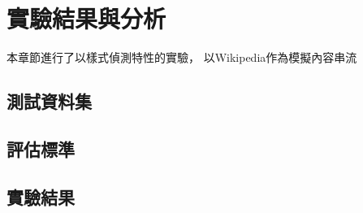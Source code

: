 %
%
%
\chapter{實驗結果與分析}
\label{c:exp}

本章節進行了以樣式偵測特性的實驗，
以Wikipedia作為模擬內容串流


\section{測試資料集}
\label{s:dataset}

\section{評估標準}
\label{s:eval}

\section{實驗結果}
\label{s:result}



